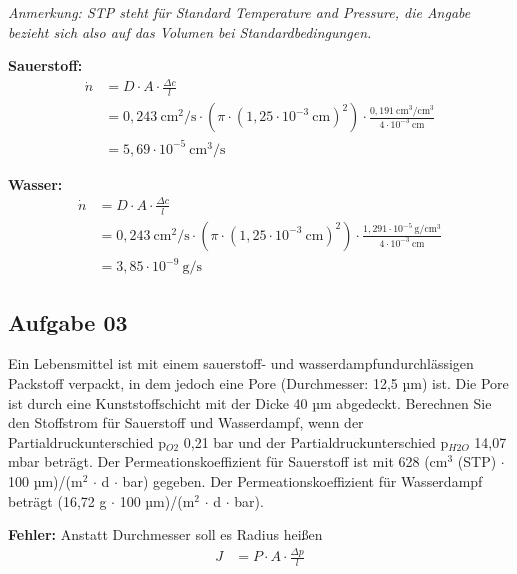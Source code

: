 \documentclass[a4paper,10pt]{article}
\begin{document}
\pp
\textit{Anmerkung: STP steht für Standard Temperature and Pressure, die Angabe bezieht sich also
auf das Volumen bei Standardbedingungen.}

\pp
\textbf{Sauerstoff:}
\begin{align*}
\dot{n} &= D \cdot A \cdot \frac{\Delta c}{l} \\
		&= 0,243 ~\text{cm}^2/\text{s} \cdot (\pi \cdot (1,25 \cdot 10^{-3}~\text{cm})^2) \cdot \frac{0,191 ~\text{cm}^3 \text{/cm$^3$}}{4 \cdot 10^{-3}~\text{cm} } \\
		&= 5,69 \cdot 10^{-5} ~\text{cm$^3$/s}
\end{align*}

\pagebreak


\textbf{Wasser:}
\begin{align*}
\dot{n} &= D \cdot A \cdot \frac{\Delta c}{l} \\
		&= 0,243 ~\text{cm}^2/\text{s} \cdot (\pi \cdot (1,25 \cdot 10^{-3}~\text{cm})^2) \cdot \frac{1,291 \cdot 10^{-5} ~\text{g}\text{/cm$^3$}}{4 \cdot 10^{-3}~\text{cm} } \\
		&= 3,85 \cdot 10^{-9} ~\text{g/s}
\end{align*}


\subsection*{Aufgabe 03}
Ein Lebensmittel ist mit einem sauerstoff- und wasserdampfundurchlässigen Packstoff
verpackt, in dem jedoch eine Pore (Durchmesser: 12,5 µm) ist. Die Pore ist durch eine
Kunststoffschicht mit der Dicke 40 µm abgedeckt. Berechnen Sie den Stoffstrom für
Sauerstoff und Wasserdampf, wenn der Partialdruckunterschied p$_{O2}$ 0,21 bar und der
Partialdruckunterschied p$_{H2O}$ 14,07 mbar beträgt. Der Permeationskoeffizient für Sauerstoff ist mit 628 (cm$^3$ (STP) $\cdot$ 100 µm)/(m$^2$ $\cdot$ d $\cdot$ bar) gegeben. Der Permeationskoeffizient für Wasserdampf beträgt (16,72 g $\cdot$ 100 µm)/(m$^2$ $\cdot$ d $\cdot$ bar). \par  
\textbf{Fehler:} Anstatt Durchmesser soll es Radius heißen
\pp 
{}
\begin{align*}
J &= P \cdot A \cdot \frac{\Delta p}{l}
\end{align*}
\end{document}
